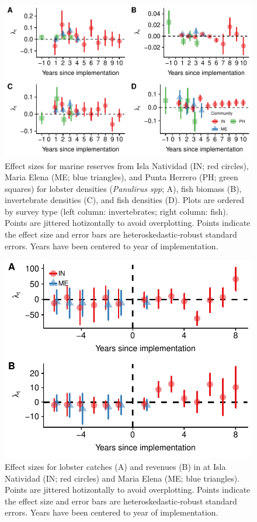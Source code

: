 \documentclass{frontiersSCNS}
\begin{document}
\begin{figure}
\centering
\includegraphics{manuscript_files/figure-latex/unnamed-chunk-8-1.pdf}
\caption{\label{fig:unnamed-chunk-8}\label{fig:indicators}Effect sizes for marine reserves from Isla Natividad (IN; red circles), Maria Elena (ME; blue triangles), and Punta Herrero (PH; green squares) for lobster densities (\emph{Panulirus spp}; A), fish biomass (B), invertebrate densities (C), and fish densities (D). Plots are ordered by survey type (left column: invertebrates; right column: fish). Points are jittered hotizontally to avoid overplotting. Points indicate the effect size and error bars are heteroskedastic-robust standard errors. Years have been centered to year of implementation.}
\end{figure}

\begin{figure}
\centering
\includegraphics{manuscript_files/figure-latex/unnamed-chunk-9-1.pdf}
\caption{\label{fig:unnamed-chunk-9}\label{fig:lobsters}Effect sizes for lobster catches (A) and revenues (B) in at Isla Natividad (IN; red circles) and Maria Elena (ME; blue triangles). Points are jittered hotizontally to avoid overplotting. Points indicate the effect size and error bars are heteroskedastic-robust standard errors. Years have been centered to year of implementation.}
\end{figure}
\end{document}
